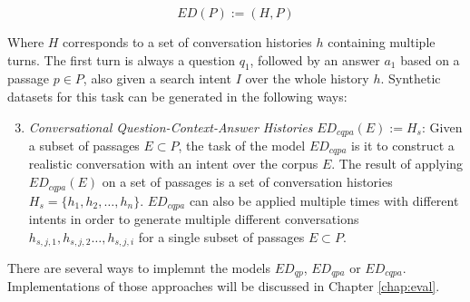 \begin{equation}
    ED(P) := (H, P)
    \label{eq:task_conversation}
\end{equation}

Where $H$ corresponds to a set of conversation histories $h$ containing multiple turns. The first turn is always a question $q_1$, followed by an answer $a_1$ based on a passage $p \in P$, also given a search intent $I$ over the whole history $h$. Synthetic datasets for this task can be generated in the following ways:

\begin{enumerate}
    \setcounter{enumi}{2} %
    \item \textit{Conversational Question-Context-Answer Histories} $ED_{cqpa}(E) := H_s$: Given a subset of passages $E \subset P$, the task of the model $ED_{cqpa}$ is it to construct a realistic conversation with an intent over the corpus $E$. The result of applying $ED_{cqpa}(E)$ on a set of passages is a set of conversation histories $H_s = \{h_1, h_2, \dots, h_n\}$. $ED_{cqpa}$ can also be applied multiple times with different intents in order to generate multiple different conversations $h_{s,j,1}, h_{s,j,2} \dots , h_{s,j,i}$ for a single subset of passages $E \subset P$.
\end{enumerate}

There are several ways to implemnt the models $ED_{qp}$, $ED_{qpa}$ or $ED_{cqpa}$. Implementations of those approaches will be discussed in Chapter \ref{chap:eval}. 



    

